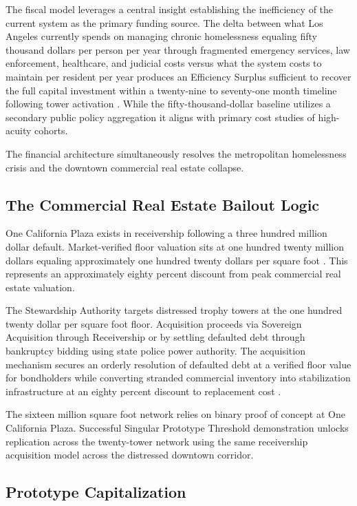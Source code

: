 \documentclass[12pt, letterpaper]{article}
\begin{document}
The fiscal model leverages a central insight establishing the inefficiency of the current system as the primary funding source. The delta between what Los Angeles currently spends on managing chronic homelessness equaling fifty thousand dollars per person per year through fragmented emergency services, law enforcement, healthcare, and judicial costs versus what the system costs to maintain per resident per year produces an Efficiency Surplus sufficient to recover the full capital investment within a twenty-nine to seventy-one month timeline following tower activation \citep{ucsf_bhhi_2023, calmatters_2026}. While the fifty-thousand-dollar baseline utilizes a secondary public policy aggregation it aligns with primary cost studies of high-acuity cohorts.

The financial architecture simultaneously resolves the metropolitan homelessness crisis and the downtown commercial real estate collapse.

\subsection{The Commercial Real Estate Bailout Logic}

One California Plaza exists in receivership following a three hundred million dollar default. Market-verified floor valuation sits at one hundred twenty million dollars equaling approximately one hundred twenty dollars per square foot \citep{globest_2025}. This represents an approximately eighty percent discount from peak commercial real estate valuation.

The Stewardship Authority targets distressed trophy towers at the one hundred twenty dollar per square foot floor. Acquisition proceeds via Sovereign Acquisition through Receivership or by settling defaulted debt through bankruptcy bidding using state police power authority. The acquisition mechanism secures an orderly resolution of defaulted debt at a verified floor value for bondholders while converting stranded commercial inventory into stabilization infrastructure at an eighty percent discount to replacement cost \citep{estrada_2026, allwork_2026}.

The sixteen million square foot network relies on binary proof of concept at One California Plaza. Successful Singular Prototype Threshold demonstration unlocks replication across the twenty-tower network using the same receivership acquisition model across the distressed downtown corridor.

\subsection{Prototype Capitalization}
\end{document}
